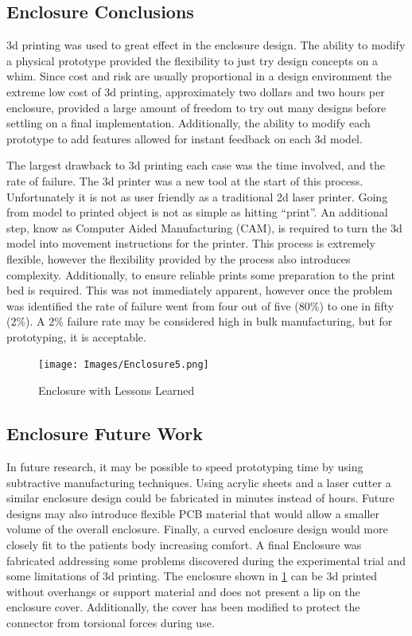 \subsection{Enclosure Conclusions}
3d printing was used to great effect in the enclosure design. The ability to modify a physical prototype provided the flexibility to just try design concepts on a whim. Since cost and risk are usually proportional in a design environment the extreme low cost of 3d printing, approximately two dollars and two hours per enclosure, provided a large amount of freedom to try out many designs before settling on a final implementation. Additionally, the ability to modify each prototype to add features allowed for instant feedback on each 3d model. 

The largest drawback to 3d printing each case was the time involved, and the rate of failure. The 3d printer was a new tool at the start of this process. Unfortunately it is not as user friendly as a traditional 2d laser printer. Going from model to printed object is not as simple as hitting ``print''. An additional step, know as Computer Aided Manufacturing (CAM), is required to turn the 3d model into movement instructions for the printer. This process is extremely flexible, however the flexibility provided by the process also introduces complexity. Additionally, to ensure reliable prints some preparation to the print bed is required. This was not immediately apparent, however once the problem was identified the rate of failure went from four out of five (80\%) to one in fifty (2\%). A 2\% failure rate may be considered high in bulk manufacturing, but for prototyping, it is acceptable.


\begin{figure}[ht]
 \begin{center}
  \label{fig:enclosure5}
  \texttt{[image: Images/Enclosure5.png]} 
  \caption{Enclosure with Lessons Learned} 
 \end{center}
\end{figure}

\subsection{Enclosure Future Work}
In future research, it may be possible to speed prototyping time by using subtractive manufacturing techniques. Using acrylic sheets and a laser cutter a similar enclosure design could be fabricated in minutes instead of hours. Future designs may also introduce flexible PCB material that would allow a smaller volume of the overall enclosure. Finally, a curved enclosure design would more closely fit to the patients body increasing comfort. A final Enclosure was fabricated addressing some problems discovered during the experimental trial and some limitations of 3d printing. The enclosure shown in \cref{fig:enclosure5} can be 3d printed without overhangs or support material and does not present a lip on the enclosure cover. Additionally, the cover has been modified to protect the  connector from torsional forces during use.







